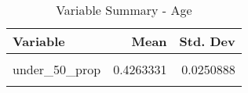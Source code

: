 \begin{table}[H]

\caption{\label{tab:tab:age}Variable Summary - Age}
\centering
\begin{tabular}[t]{lrr}
\toprule
Variable & Mean & Std. Dev\\
\midrule
\cellcolor{gray!6}{under\_30\_prop} & \cellcolor{gray!6}{0.1783916} & \cellcolor{gray!6}{0.0215276}\\
under\_50\_prop & 0.4263331 & 0.0250888\\
\cellcolor{gray!6}{over\_50\_prop} & \cellcolor{gray!6}{0.3952753} & \cellcolor{gray!6}{0.0342421}\\
\bottomrule
\end{tabular}
\end{table}
